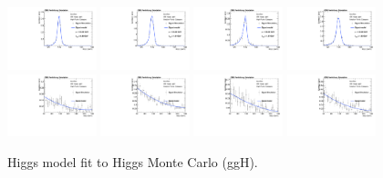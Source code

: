 \begin{figure}[h]
  \centering
\includegraphics[width=0.23\textwidth]{figures/sec-signals/HiggsShapes/ggh_HM_signal_fit_mgg_cat0.pdf}
\includegraphics[width=0.23\textwidth]{figures/sec-signals/HiggsShapes/ggh_HM_signal_fit_mgg_cat1.pdf}
\includegraphics[width=0.23\textwidth]{figures/sec-signals/HiggsShapes/ggh_LM_signal_fit_mgg_cat0.pdf}
\includegraphics[width=0.23\textwidth]{figures/sec-signals/HiggsShapes/ggh_LM_signal_fit_mgg_cat1.pdf}
\includegraphics[width=0.23\textwidth]{figures/sec-signals/HiggsShapes/ggh_HM_signal_fit_mjj_cat0.pdf}
\includegraphics[width=0.23\textwidth]{figures/sec-signals/HiggsShapes/ggh_HM_signal_fit_mjj_cat1.pdf}
\includegraphics[width=0.23\textwidth]{figures/sec-signals/HiggsShapes/ggh_LM_signal_fit_mjj_cat0.pdf}
\includegraphics[width=0.23\textwidth]{figures/sec-signals/HiggsShapes/ggh_LM_signal_fit_mjj_cat1.pdf}
  \caption{Higgs model fit to Higgs Monte Carlo (ggH).}
  \label{fig:higgs_fit_ggh}
\end{figure}

